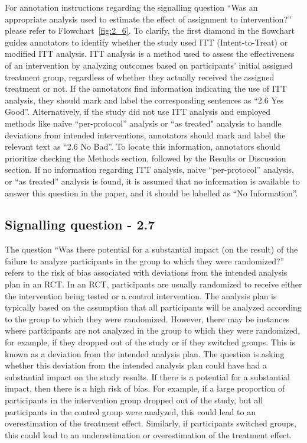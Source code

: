 \documentclass[sn-mathphys,Numbered]{sn-jnl}%
\begin{document}
For annotation instructions regarding the signalling question ``Was an appropriate analysis used to estimate the effect of assignment to intervention?'' please refer to Flowchart~\ref{fig:2_6}.
To clarify, the first diamond in the flowchart guides annotators to identify whether the study used ITT (Intent-to-Treat) or modified ITT analysis.
ITT analysis is a method used to assess the effectiveness of an intervention by analyzing outcomes based on participants' initial assigned treatment group, regardless of whether they actually received the assigned treatment or not.
If the annotators find information indicating the use of ITT analysis, they should mark and label the corresponding sentences as ``2.6 Yes Good''.
Alternatively, if the study did not use ITT analysis and employed methods like naive ``per-protocol'' analysis or ``as treated" analysis to handle deviations from intended interventions, annotators should mark and label the relevant text as ``2.6 No Bad''.
To locate this information, annotators should prioritize checking the Methods section, followed by the Results or Discussion section.
If no information regarding ITT analysis, naive ``per-protocol'' analysis, or ``as treated'' analysis is found, it is assumed that no information is available to answer this question in the paper, and it should be labelled as ``No Information''.
%
%
%
\subsection*{Signalling question - 2.7 }
%
The question ``Was there potential for a substantial impact (on the result) of the failure to analyze participants in the group to which they were randomized?'' refers to the risk of bias associated with deviations from the intended analysis plan in an RCT.
In an RCT, participants are usually randomized to receive either the intervention being tested or a control intervention.
The analysis plan is typically based on the assumption that all participants will be analyzed according to the group to which they were randomized.
However, there may be instances where participants are not analyzed in the group to which they were randomized, for example, if they dropped out of the study or if they switched groups.
This is known as a deviation from the intended analysis plan.
The question is asking whether this deviation from the intended analysis plan could have had a substantial impact on the study results.
If there is a potential for a substantial impact, then there is a high risk of bias.
For example, if a large proportion of participants in the intervention group dropped out of the study, but all participants in the control group were analyzed, this could lead to an overestimation of the treatment effect.
Similarly, if participants switched groups, this could lead to an underestimation or overestimation of the treatment effect.
\end{document}
